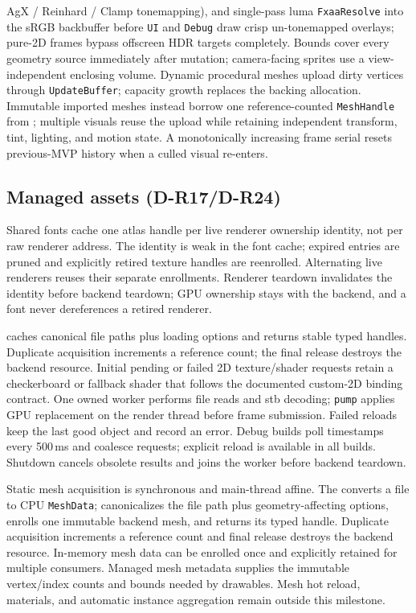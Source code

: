 \begin{itemize}
        AgX / Reinhard / Clamp tonemapping), and single-pass luma
        \texttt{FxaaResolve} into the sRGB backbuffer before \texttt{UI} and
        \texttt{Debug} draw crisp un-tonemapped overlays; pure-2D frames bypass
        offscreen HDR targets completely. Bounds cover every geometry source
        immediately after mutation; camera-facing sprites use a
        view-independent enclosing volume. Dynamic
        procedural meshes upload dirty vertices through \texttt{UpdateBuffer};
        capacity growth replaces the backing allocation. Immutable imported
        meshes instead borrow one reference-counted \texttt{MeshHandle} from
        ; multiple visuals reuse the upload while
        retaining independent transform, tint, lighting, and motion state.
        A monotonically increasing frame
        serial resets previous-MVP history when a culled visual re-enters.
\end{itemize}

\subsection{Managed assets (D-R17/D-R24)}
Shared fonts cache one atlas handle per live renderer ownership identity,
not per raw renderer address. The identity is weak in the font cache; expired
entries are pruned and explicitly retired texture handles are reenrolled.
Alternating live renderers reuses their separate enrollments. Renderer teardown
invalidates the identity before backend teardown; GPU ownership stays with the
backend, and a font never dereferences a retired renderer.

 caches canonical file paths plus loading options and
returns stable typed handles. Duplicate acquisition increments a reference
count; the final release destroys the backend resource. Initial pending or
failed 2D texture/shader requests retain a checkerboard or fallback shader that follows
the documented custom-2D binding contract. One owned worker performs file reads
and stb decoding; \texttt{pump} applies GPU
replacement on the render thread before frame submission. Failed reloads keep
the last good object and record an error. Debug builds poll timestamps every
500\,ms and coalesce requests; explicit reload is available in all builds.
Shutdown cancels obsolete results and joins the worker before backend teardown.

Static mesh acquisition is synchronous and main-thread affine. The
 converts a file to CPU \texttt{MeshData};
 canonicalizes the file path plus geometry-affecting
options, enrolls one immutable backend mesh, and returns its typed handle.
Duplicate acquisition increments a reference count and final release destroys
the backend resource. In-memory mesh data can be enrolled once and explicitly
retained for multiple consumers. Managed mesh metadata supplies the immutable
vertex/index counts and bounds needed by drawables. Mesh hot reload, materials,
and automatic instance aggregation remain outside this milestone.

